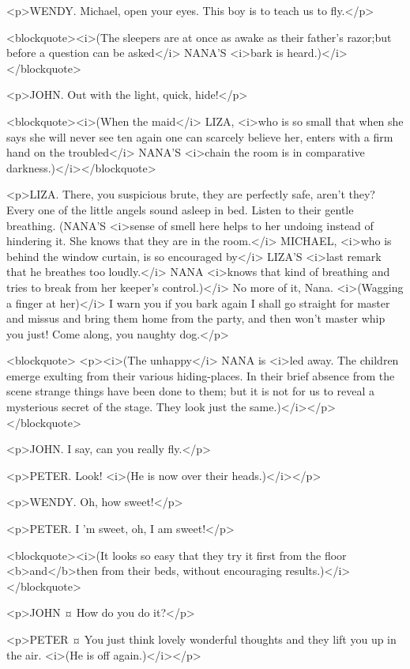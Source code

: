 <p>WENDY. Michael, open your eyes. This boy is to teach us to fly.</p>

<blockquote><i>(The sleepers are at once as awake as their father's razor;but before a question can be asked</i> NANA'S <i>bark is heard.)</i></blockquote>

<p>JOHN. Out with the light, quick, hide!</p>

<blockquote><i>(When the maid</i> LIZA, <i>who is so small that when she says she will never see ten again one can scarcely believe her, enters with a firm hand on the troubled</i> NANA'S <i>chain the room is in comparative darkness.)</i></blockquote>

<p>LIZA. There, you suspicious brute, they are perfectly safe, aren't they? Every one of the little angels sound asleep in bed. Listen to their gentle breathing. (NANA'S <i>sense of smell here helps to her undoing instead of hindering it. She knows that they are in the room.</i> MICHAEL, <i>who is behind the window curtain, is so encouraged by</i> LIZA'S <i>last remark that he breathes too loudly.</i> NANA <i>knows that kind of breathing and tries to break from her keeper's control.)</i> No more of it, Nana. <i>(Wagging a finger at her)</i> I warn you if you bark again I shall go straight for master and missus and bring them home from the party, and then won't master whip you just! Come along, you naughty dog.</p>

<blockquote> <p><i>(The unhappy</i> NANA is <i>led away. The children emerge exulting from their various hiding-places. In their brief absence from the scene strange things have been done to them; but it is not for us to reveal a mysterious secret of the stage. They look just the same.)</i></p> </blockquote>

<p>JOHN. I say, can you really fly.</p>

<p>PETER. Look! <i>(He is now over their heads.)</i></p>

<p>WENDY. Oh, how sweet!</p>

<p>PETER. I 'm sweet, oh, I am sweet!</p>

<blockquote><i>(It looks so easy that they try it first from the floor <b>and</b>then from their beds, without encouraging results.)</i></blockquote>

<p>JOHN ¤
How do you do it?</p>

<p>PETER ¤
You just think lovely wonderful thoughts and they lift you up in the air. <i>(He is off again.)</i></p>

